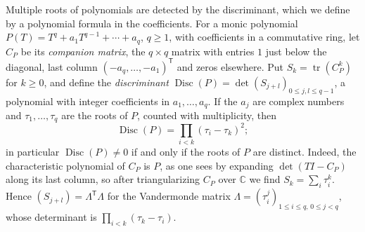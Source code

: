 Multiple roots of polynomials are detected by the discriminant, which we define by a polynomial formula in the coefficients. For a monic polynomial $P(T)=T^q+a_1T^{q-1}+\cdots+a_q$, $q\geq1$, with coefficients in a commutative ring, let $C_P$ be its \emph{companion matrix}, the $q\times q$ matrix with entries $1$ just below the diagonal, last column $(-a_q,\ldots,-a_1)^{\mathsf T}$ and zeros elsewhere. Put $S_k=\operatorname{tr}(C_P^k)$ for $k\geq0$, and define the \emph{discriminant} $\operatorname{Disc}(P)=\det(S_{j+l})_{0\leq j,l\leq q-1}$, a polynomial with integer coefficients in $a_1,\ldots,a_q$. If the $a_j$ are complex numbers and $\tau_1,\ldots,\tau_q$ are the roots of $P$, counted with multiplicity, then
\begin{equation}\label{eq:discriminant-roots}
 \operatorname{Disc}(P)=\prod_{i<k}(\tau_i-\tau_k)^2;
\end{equation}
in particular $\operatorname{Disc}(P)\neq0$ if and only if the roots of $P$ are distinct. Indeed, the characteristic polynomial of $C_P$ is $P$, as one sees by expanding $\det(TI-C_P)$ along its last column, so after triangularizing $C_P$ over $\mathbb C$ we find $S_k=\sum_i\tau_i^k$. Hence $(S_{j+l})=\Lambda^{\mathsf T}\Lambda$ for the Vandermonde matrix $\Lambda=(\tau_i^j)_{1\leq i\leq q,\,0\leq j<q}$, whose determinant is $\prod_{i<k}(\tau_k-\tau_i)$.

